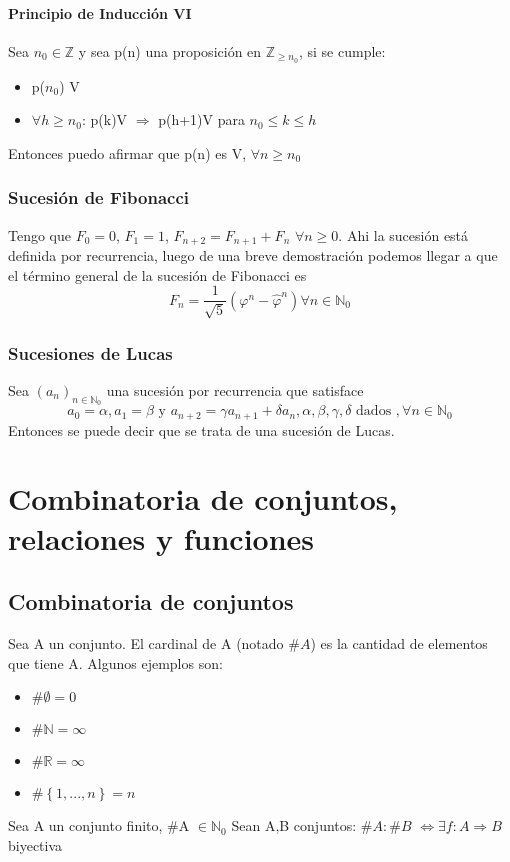 \documentclass{report}
\newcommand{\card}[1]{\##1}
\begin{document}
\subsubsection{Principio de Inducción VI}
Sea $n_0 \in \mathbb{Z}$ y sea p(n) una proposición en $\mathbb{Z}_{\geq n_0}$, si se cumple:
\begin{itemize}
    \item p($n_0$) V
    \item $\forall h \geq n_0$: p(k)V $\Rightarrow$ p(h+1)V para $n_0 \leq k \leq h$
\end{itemize}
Entonces puedo afirmar que p(n) es V, $\forall n \geq n_0$

\subsection{Sucesión de Fibonacci}
Tengo que $F_0 = 0$, $F_1 = 1$, $F_{n+2} = F_{n+1} + F_{n}$ $\forall n \geq 0$. Ahi la sucesión está definida por recurrencia, luego de una breve demostración podemos llegar a que el término general de la sucesión de Fibonacci es
\begin{equation}
    F_n = \frac{1}{\sqrt{5}}(\varphi^n - \hat{\varphi}^n) \forall n \in \mathbb{N}_0
\end{equation}

\subsection{Sucesiones de Lucas}
Sea $(a_n)_{n \in \mathbb{N}_0}$ una sucesión por recurrencia que satisface
\begin{equation}
    a_0 = \alpha, a_1 = \beta \text{ y } a_{n+2} = \gamma a_{n+1} + \delta a_n, \alpha,\beta,\gamma,\delta \text{ dados }, \forall n \in \mathbb{N}_0 
\end{equation}
Entonces se puede decir que se trata de una sucesión de Lucas.

\chapter{Combinatoria de conjuntos, relaciones y funciones}
\section{Combinatoria de conjuntos}

Sea A un conjunto. El cardinal de A (notado $\card{A}$) es la cantidad de elementos que tiene A. Algunos ejemplos son: \begin{itemize}
        \item $\card{\emptyset} = 0$
        \item $\card{\mathbb{N}} = \infty$
        \item $\card{\mathbb{R}} = \infty$
        \item $\card{\left\{1,...,n\right\}}=n$
\end{itemize}
Sea A un conjunto finito, \card{A} $\in \mathbb{N}_0$
Sean A,B conjuntos: $\card{A}:\card{B}$ $\iff \exists f:A \Rightarrow B$ biyectiva
\end{document}
